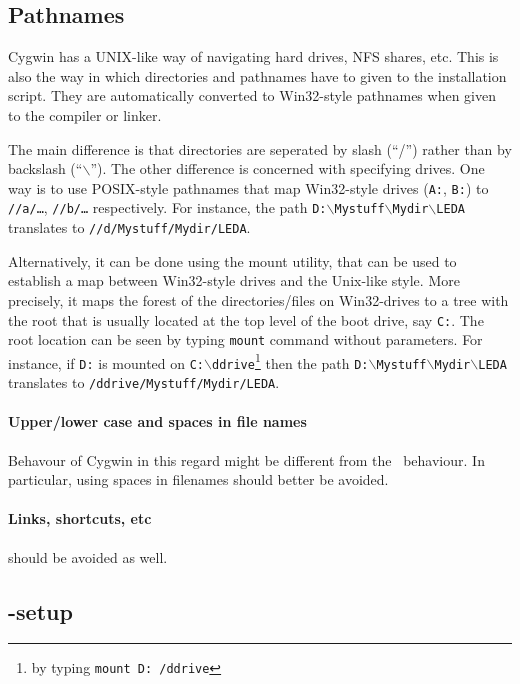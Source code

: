 \subsection{Pathnames}

Cygwin has a UNIX-like way of navigating hard drives, NFS shares, etc.
This is also the way in which directories and pathnames have to given
to the installation script. They are automatically converted to
Win32-style pathnames when given to the compiler or linker.

The main difference is that directories are seperated by slash (``/'')
rather than by backslash (``$\backslash$'').  The other difference is
concerned with specifying drives. One way is to use POSIX-style
pathnames that map Win32-style drives (\texttt{A:}, \texttt{B:}) to
\texttt{//a/\ldots}, \texttt{//b/\ldots} respectively. For instance,
the path
\texttt{D:$\backslash$Mystuff$\backslash$Mydir$\backslash$LEDA}
translates to \texttt{//d/Mystuff/Mydir/LEDA}.

Alternatively, it can be done using the mount utility, that can be
used to establish a map between Win32-style drives and the Unix-like
style. More precisely, it maps the forest of the directories/files on
Win32-drives to a tree with the root that is usually located at the top
level of the boot drive, say \texttt{C:}.  The root location can be
seen by typing \texttt{mount} command without parameters.  For
instance, if \texttt{D:} is mounted on
\texttt{C:$\backslash$ddrive}\footnote{by typing \texttt{mount D:
    /ddrive}} then the path
\texttt{D:$\backslash$Mystuff$\backslash$Mydir$\backslash$LEDA}
translates to \texttt{/ddrive/Mystuff/Mydir/LEDA}.

\paragraph{Upper/lower case and spaces in file names}
Behavour of Cygwin in this regard might be different from the \mswin\ 
behaviour. In particular, using spaces in filenames should better be
avoided.

\paragraph{Links, shortcuts, etc} should be avoided as well.

\subsection{\msvc{}-setup}

